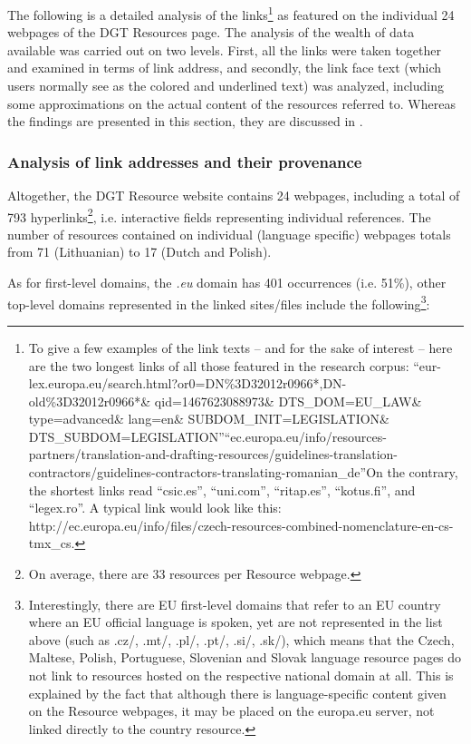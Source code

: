 \documentclass[output=paper]{langsci/langscibook}
\begin{document}
The following is a detailed analysis of the links\footnote{To give a few examples of the link texts – and for the sake of interest – here are the two longest links of all those featured in the research corpus: “eur-lex.europa.eu/search.html?or0=DN\%3D32012r0966*,DN-old\%3D32012r0966*\& qid=1467623088973\& DTS\_DOM=EU\_LAW\& type=advanced\& lang=en\& SUBDOM\_INIT=LEGISLATION\& DTS\_SUBDOM=LEGISLATION”“ec.europa.eu/info/resources-partners/translation-and-drafting-resources/guidelines-translation-contractors/guidelines-contractors-translating-romanian\_de”On the contrary, the shortest links read “csic.es”, “uni.com”, “ritap.es”, “kotus.fi”, and “legex.ro”. A typical link would look like this: http://ec.europa.eu/info/files/czech-resources-combined-nomenclature-en-cs-tmx\_cs.} as featured on the individual 24 webpages of the DGT Resources page. The analysis of the wealth of data available was carried out on two levels. First, all the links were taken together and examined in terms of link address, and secondly, the link face text (which users normally see as the colored and underlined text) was analyzed, including some approximations on the actual content of the resources referred to. Whereas the findings are presented in this section, they are discussed in .

\subsubsection{Analysis of link addresses and their provenance}\label{sec:svoboda:4.4.1}

Altogether, the DGT Resource website contains 24 webpages, including a total of 793 hyperlinks\footnote{On average, there are 33 resources per Resource webpage.}, i.e. interactive fields representing individual references. The number of resources contained on individual (language specific) webpages totals from 71 (Lithuanian) to 17 (Dutch and Polish).

As for first-level domains, the \textit{.eu} domain has 401 occurrences (i.e. 51\%), other top-level domains represented in the linked sites/files include the following\footnote{Interestingly, there are EU first-level domains that refer to an EU country where an EU official language is spoken, yet are not represented in the list above (such as .cz/, .mt/, .pl/, .pt/, .si/, .sk/), which means that the Czech, Maltese, Polish, Portuguese, Slovenian and Slovak language resource pages do not link to resources hosted on the respective national domain at all. This is explained by the fact that although there is language-specific content given on the Resource webpages, it may be placed on the europa.eu server, not linked directly to the country resource.}: 
\end{document}
